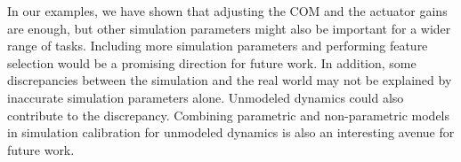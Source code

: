  In our examples, we have shown that adjusting the COM and the actuator gains are enough, but other simulation parameters might also be important for a wider range of tasks. Including more simulation parameters and performing feature selection would be a promising direction for future work. In addition, some discrepancies between the simulation and the real world may not be explained by inaccurate simulation parameters alone. Unmodeled dynamics could also contribute to the discrepancy. Combining parametric and non-parametric models in simulation calibration for unmodeled dynamics is also an interesting avenue for future work.


